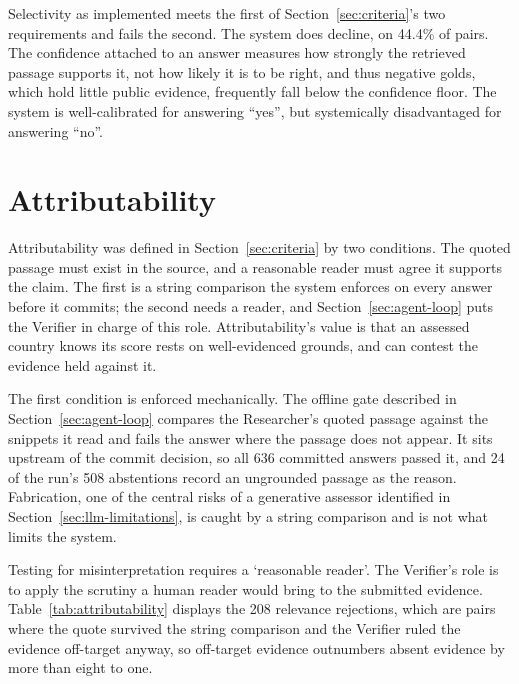 Selectivity as implemented meets the first of Section~\ref{sec:criteria}'s two requirements and fails the second. The system does decline, on 44.4\% of pairs. The confidence attached to an answer measures how strongly the retrieved passage supports it, not how likely it is to be right, and thus negative golds, which hold little public evidence, frequently fall below the confidence floor. The system is well-calibrated for answering ``yes'', but systemically disadvantaged for answering ``no''.

\section{Attributability}\label{sec:attributability}

Attributability was defined in Section~\ref{sec:criteria} by two conditions. The quoted passage must exist in the source, and a reasonable reader must agree it supports the claim. The first is a string comparison the system enforces on every answer before it commits; the second needs a reader, and Section~\ref{sec:agent-loop} puts the Verifier in charge of this role. Attributability's value is that an assessed country knows its score rests on well-evidenced grounds, and can contest the evidence held against it.

The first condition is enforced mechanically. The offline gate described in Section~\ref{sec:agent-loop} compares the Researcher's quoted passage against the snippets it read and fails the answer where the passage does not appear. It sits upstream of the commit decision, so all 636 committed answers passed it, and 24 of the run's 508 abstentions record an ungrounded passage as the reason. Fabrication, one of the central risks of a generative assessor identified in Section~\ref{sec:llm-limitations}, is caught by a string comparison and is not what limits the system.

Testing for misinterpretation requires a `reasonable reader'. The Verifier's role is to apply the scrutiny a human reader would bring to the submitted evidence. Table~\ref{tab:attributability} displays the 208 relevance rejections, which are pairs where the quote survived the string comparison and the Verifier ruled the evidence off-target anyway, so off-target evidence outnumbers absent evidence by more than eight to one.

